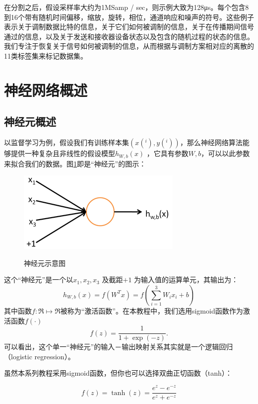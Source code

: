 在分割之后，假设采样率大约为1MSamp / sec，则示例大致为128μs。每个包含8到16个带有随机时间偏移，缩放，旋转，相位，通道响应和噪声的符号。这些例子表示关于调制数据比特的信息，关于它们如何被调制的信息，关于在传播期间信号通过的信息，以及关于发送和接收器设备状态以及包含的随机过程的状态的信息。我们专注于恢复关于信号如何被调制的信息，从而根据与调制方案相对应的离散的11类标签集来标记数据集。\par

\section{神经网络概述}
\subsection{神经元概述}
以监督学习为例，假设我们有训练样本集$(x(^i),y(^i))$，那么神经网络算法能够提供一种复杂且非线性的假设模型$h_{W,b}(x)$ ，它具有参数$W, b$，可以以此参数来拟合我们的数据。图\ref{fig_2_1}即是“神经元”的图示：\par
\begin{figure}[htbp]
	\centering
	\includegraphics[scale=0.5]{figures/chapter_2/SingleNeuron.png}\\
	\caption{神经元示意图}\label{fig_2_1}
\end{figure}
这个“神经元”是一个以$x_1, x_2, x_3$ 及截距$+1$ 为输入值的运算单元，其输出为：
\begin{equation}
	h_{W,b}(x) = f(W^Tx) = f(\sum_{i=1}^3 W_{i}x_i +b)
\end{equation} 
其中函数$f : \Re \mapsto \Re$被称为“激活函数”。在本教程中，我们选用sigmoid函数作为激活函数$f(\cdot)$
\begin{equation}
	f(z) = \frac{1}{1+\exp(-z)}.
\end{equation}
可以看出，这个单一“神经元”的输入－输出映射关系其实就是一个逻辑回归（logistic regression）。\par
虽然本系列教程采用sigmoid函数，但你也可以选择双曲正切函数（tanh）：\par
\begin{equation}
f(z) = \tanh(z) = \frac{e^z - e^{-z}}{e^z + e^{-z}}
\end{equation}
